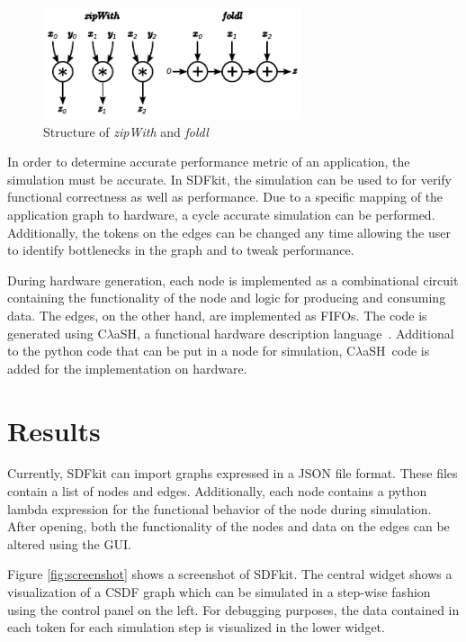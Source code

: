 \documentclass[journal]{IEEEtran}
\newcommand{\clash}{C$\lambda$aSH}
\begin{document}
  \begin{figure}[h!]
    \centering
    \includegraphics[width=3in]{HOFs}
    \caption{Structure of \emph{zipWith} and \emph{foldl}}
    \label{fig:zipwthandfoldlstruct}
  \end{figure}

  
  In order to determine accurate performance metric of an application, the simulation must be accurate.
  In SDFkit, the simulation can be used to for verify functional correctness as well as performance.
  Due to a specific mapping of the application graph to hardware, a cycle accurate simulation can be performed.
  Additionally, the tokens on the edges can be changed any time allowing the user to identify bottlenecks in the graph and to tweak performance.
  
  During hardware generation, each node is implemented as a combinational circuit containing the functionality of the node and logic for producing and consuming data.
  The edges, on the other hand, are implemented as FIFOs.
  The code is generated using \clash, a functional hardware description language~\cite{Baaij10}.
  Additional to the python code that can be put in a node for simulation, \clash\ code is added for the implementation on hardware.


\section{Results}
\label{sec:results}

  Currently, SDFkit can import graphs expressed in a JSON file format.
  These files contain a list of nodes and edges.
  Additionally, each node contains a python lambda expression for the functional behavior of the node during simulation.
  After opening, both the functionality of the nodes and data on the edges can be altered using the GUI.

  Figure \ref{fig:screenshot} shows a screenshot of SDFkit.
  The central widget shows a visualization of a CSDF graph which can be simulated in a step-wise fashion using the control panel on the left.
  For debugging purposes, the data contained in each token for each simulation step is visualized in the lower widget.
\end{document}
